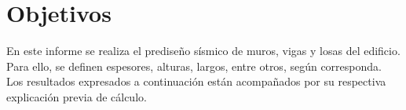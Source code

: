 \documentclass[letterpaper,11pt]{article} %
\begin{document}








\section{Objetivos}
En este informe se realiza el prediseño sísmico de muros, vigas y losas del edificio. Para ello, se definen espesores, alturas, largos, entre otros, según corresponda.\\

Los resultados expresados a continuación están acompañados por su respectiva explicación previa de cálculo.
\end{document}
